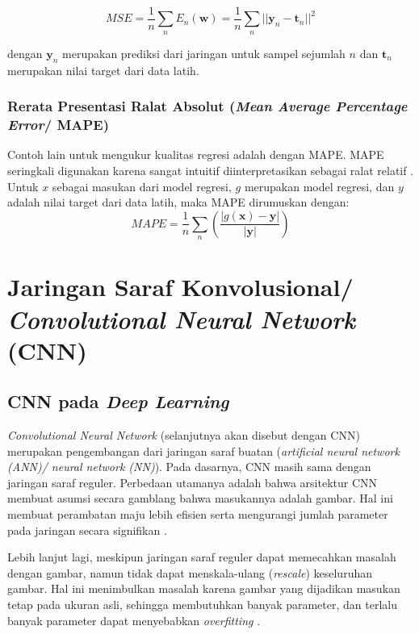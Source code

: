 \begin{equation}
   MSE = \frac{1}{n} \sum\limits_n E_n(\textbf{w}) = \frac{1}{n}\sum\limits_n ||\textbf{y}_n - \textbf{t}_n||^2
\end{equation}

dengan $\textbf{y}_n$ merupakan prediksi dari jaringan untuk sampel sejumlah $n$ dan $\textbf{t}_n$ merupakan nilai target dari data latih. 

\subsubsection{Rerata Presentasi Ralat Absolut (\emph{Mean Average Percentage Error}/ MAPE) }
Contoh lain untuk mengukur kualitas regresi adalah dengan MAPE. MAPE seringkali digunakan karena sangat intuitif diinterpretasikan sebagai ralat relatif \citep{DEMYTTENAERE201638}. Untuk $x$ sebagai masukan dari model regresi, $g$ merupakan model regresi, dan $y$ adalah nilai target dari data latih, maka MAPE dirumuskan dengan:
\begin{equation}\label{mape}
    MAPE = \frac{1}{n} \sum \limits_n \left(\frac{|g(\textbf{x})-\textbf{y}|}{|\textbf{y}|}\right)
\end{equation}

\section{Jaringan Saraf Konvolusional/ \emph{Convolutional Neural Network} (CNN)}
\subsection{CNN pada \emph{Deep Learning}}
\emph{Convolutional Neural Network} (selanjutnya akan disebut dengan CNN) merupakan pengembangan dari jaringan saraf buatan (\emph{artificial neural network (ANN)/ neural network (NN)}). Pada dasarnya, CNN masih sama dengan jaringan saraf reguler. Perbedaan utamanya adalah bahwa arsitektur CNN membuat asumsi secara gamblang bahwa masukannya adalah gambar. Hal ini membuat perambatan maju lebih efisien serta mengurangi jumlah parameter pada jaringan secara signifikan \citep{Li_Li_Gao}.

Lebih lanjut lagi, meskipun jaringan saraf reguler dapat memecahkan masalah dengan gambar, namun tidak dapat menskala-ulang (\emph{rescale}) keseluruhan gambar. Hal ini menimbulkan masalah karena gambar yang dijadikan masukan tetap pada ukuran asli, sehingga membutuhkan banyak parameter, dan terlalu banyak parameter dapat menyebabkan \emph{overfitting} \citep{Li_Li_Gao}. 


